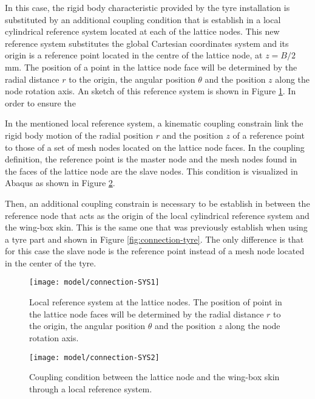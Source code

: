     In this case, the rigid body characteristic provided by the tyre installation is substituted by an additional coupling condition that is establish in a local cylindrical reference system located at each of the lattice nodes. This new reference system substitutes the global Cartesian coordinates system and its origin is a reference point located in the centre of the lattice node,  at $z=B/2$mm. The position of a point in the lattice node face will be determined by the radial distance $r$ to the origin, the angular position $\theta$ and the position $z$ along the node rotation axis. An sketch of this reference system is shown in Figure \ref{fig:connection-localSYS1}. In order to ensure the

    In the mentioned local reference system, a kinematic coupling constrain link the rigid body motion of the radial position $r$ and the position $z$ of a reference point to those of a set of mesh nodes located on the lattice node faces. In the coupling definition, the reference point is the master node and the mesh nodes found in the faces of the lattice node are the slave nodes. This condition is visualized in Abaqus as shown in Figure \ref{fig:connection-localSYS2}.

    Then, an additional coupling constrain is necessary to be establish in between the reference node that acts as the origin of the local cylindrical reference system and the wing-box skin. This is the same one that was previously establish when using a tyre part and shown in Figure \ref{fig:connection-tyre}. The only difference is that for this case the slave node is the reference point instead of a mesh node located in the center of the tyre.

    \begin{figure}[!htpb]
      \centering
      \texttt{[image: model/connection-SYS1]}
      \caption[Local reference system at the lattice nodes]{Local reference system at the lattice nodes. The position of point in the lattice node faces will be determined by the radial distance $r$ to the origin, the angular position $\theta$ and the position $z$ along the node rotation axis.}\label{fig:connection-localSYS1}
    \end{figure}

    \begin{figure}[!htpb]
      \centering
      \texttt{[image: model/connection-SYS2]}
      \caption[Coupling condition between the lattice node and the wing-box skin through a local reference system]{Coupling condition between the lattice node and the wing-box skin through a local reference system. }\label{fig:connection-localSYS2}
    \end{figure}

